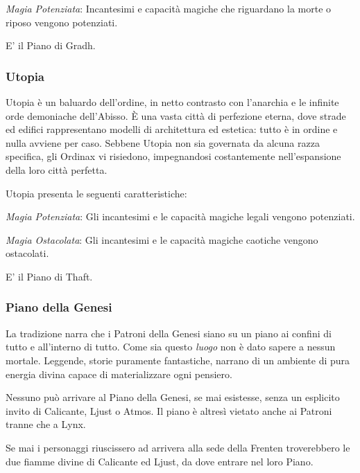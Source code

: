 \documentclass[a4paper,twoside,openany]{book}
\begin{document}
\begin{multicols}{2}
\emph{Magia Potenziata}: Incantesimi e capacità magiche che riguardano la morte o riposo vengono potenziati.

E' il Piano di Gradh.

\subsubsection{Utopia}\label{pianoutopia}
Utopia è un baluardo dell'ordine, in netto contrasto con l'anarchia e le infinite orde demoniache dell'Abisso. È una vasta città di perfezione eterna, dove strade ed edifici rappresentano modelli di architettura ed estetica: tutto è in ordine e nulla avviene per caso. Sebbene Utopia non sia governata da alcuna razza specifica, gli Ordinax vi risiedono, impegnandosi costantemente nell'espansione della loro città perfetta.

Utopia presenta le seguenti caratteristiche:

\emph{Magia Potenziata}: Gli incantesimi e le capacità magiche legali vengono potenziati.

\emph{Magia Ostacolata}: Gli incantesimi e le capacità magiche caotiche vengono ostacolati.

E' il Piano di Thaft.

\subsubsection{Piano della Genesi}\label{pianogenesi}

La tradizione narra che i Patroni della Genesi siano su un piano ai confini di tutto e all'interno di tutto. Come sia questo \emph{luogo} non è dato sapere a nessun mortale. Leggende, storie puramente fantastiche, narrano di un ambiente di pura energia divina capace di materializzare ogni pensiero.

Nessuno può arrivare al Piano della Genesi, se mai esistesse, senza un esplicito invito di Calicante, Ljust o Atmos. Il piano è altresì vietato anche ai Patroni tranne che a Lynx.

Se mai i personaggi riuscissero ad arrivera alla sede della Frenten troverebbero le due fiamme divine di Calicante ed Ljust, da dove entrare nel loro Piano.

\end{multicols}

\vfill
\end{document}

